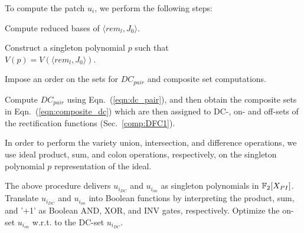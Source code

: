To compute the patch $u_i$, we perform the following steps:
\bi
\item Compute reduced \Grobner bases of $\langle rem_l, J_0 \rangle$.
\item Construct a singleton polynomial $p$ such that \\ $V(p) = V(\langle rem_l, J_0 \rangle)$.
\item Impose an order on the sets for $DC_{pair}$ and composite set computations.
\item Compute $DC_{pair}$ using Eqn.~(\ref{eqn:dc_pair}), and then obtain the composite sets
      in Eqn.~(\ref{eqn:composite_dc}) which are then assigned to DC-, on- and off-sets of the 
      rectification functions (Sec.~\ref{comp:DFC1}).
\item In order to perform the variety union, intersection, and difference operations, we use ideal 
        product, sum, and colon operations, respectively, on the
        singleton polynomial $p$ representation of the ideal.
\item The above procedure delivers $u_{i_{DC}}$ and $u_{i_{on}}$ as singleton polynomials in ${\mathbb{F}}_{2}[X_{PI}]$.
Translate $u_{i_{DC}}$ and $u_{i_{on}}$ into Boolean functions by interpreting the product, sum,
and '+1' as Boolean AND, XOR, and INV gates, respectively. Optimize the on-set $u_{i_{on}}$ w.r.t. to the DC-set $u_{i_{DC}}$.
\ei





